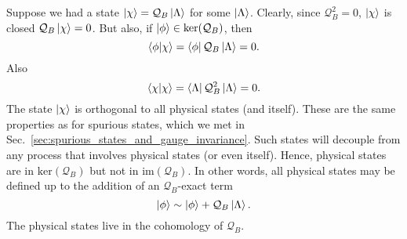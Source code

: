Suppose we had a state $\ket{\chi} = \mathcal{Q}_B \ket{\Lambda}$ for some $\ket{\Lambda}$.
Clearly, since $\mathcal{Q}_B^2 = 0$, $\ket{\chi}$ is closed $\mathcal{Q}_B \ket{\chi} = 0$.
But also, if $\ket{\phi} \in \text{ker}(\mathcal{Q}_B)$, then
\begin{equation}
  \bra{\phi} \ket{\chi} = \bra{\phi} \mathcal{Q}_B \ket{\Lambda} = 0.
\end{equation}
Also
\begin{equation}
  \bra{\chi} \ket{\chi} = \bra{\Lambda} \mathcal{Q}_B^2 \ket{\Lambda} = 0.
\end{equation}
The state $\ket{\chi}$ is orthogonal to all physical states (and itself).
These are the same properties as for spurious states, which we met in Sec.~\ref{sec:spurious_states_and_gauge_invariance}.
Such states will decouple from any process that involves physical states (or even itself).
Hence, physical states are in $\text{ker}(\mathcal{Q}_B)$ but not in $\text{im}(\mathcal{Q}_B)$. 
In other words, all physical states may be defined up to the addition of an $\mathcal{Q}_B$-exact term
\begin{equation}
  \ket{\phi} \sim \ket{\phi} + \mathcal{Q}_B \ket{\Lambda}.
\end{equation}
The physical states live in the cohomology of $\mathcal{Q}_B$.
